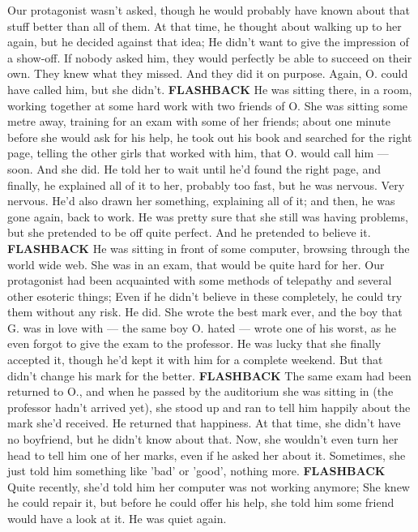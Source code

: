 Our protagonist wasn't asked, though he would probably have known about that stuff better than all of them. 
At that time, he thought about walking up to her again, but he decided against that idea; He didn't want to give the impression of a show-off. 
If nobody asked him, they would perfectly be able to succeed on their own. 
They knew what they missed. 
And they did it on purpose. 
Again, O. could have called him, but she didn't. 
\textbf{FLASHBACK}
He was sitting there, in a room, working together at some hard work with two friends of O. 
She was sitting some metre away, training for an exam with some of her friends; about one minute before she would ask for his help, he took out his book and searched for the right page, telling the other girls that worked with him, that O. would call him --- soon. 
And she did. 
He told her to wait until he'd found the right page, and finally, he explained all of it to her, probably too fast, but he was nervous. 
Very nervous. 
He'd also drawn her something, explaining all of it; and then, he was gone again, back to work. 
He was pretty sure that she still was having problems, but she pretended to be off quite perfect. 
And he pretended to believe it. 
\textbf{FLASHBACK}
He was sitting in front of some computer, browsing through the world wide web. 
She was in an exam, that would be quite hard for her. 
Our protagonist had been acquainted with some methods of telepathy and several other esoteric things; Even if he didn't believe in these completely, he could try them without any risk. 
He did. 
She wrote the best mark ever, and the boy that G. was in love with --- the same boy O. hated --- wrote one of his worst, as he even forgot to give the exam to the professor. 
He was lucky that she finally accepted it, though he'd kept it with him for a complete weekend. 
But that didn't change his mark for the better. 
\textbf{FLASHBACK}
The same exam had been returned to O., and when he passed by the auditorium she was sitting in (the professor hadn't arrived yet), she stood up and ran to tell him happily about the mark she'd received. 
He returned that happiness. 
At that time, she didn't have no boyfriend, but he didn't know about that. 
Now, she wouldn't even turn her head to tell him one of her marks, even if he asked her about it. 
Sometimes, she just told him something like 'bad' or 'good', nothing more. 
\textbf{FLASHBACK}
Quite recently, she'd told him her computer was not working anymore; She knew he could repair it, but before he could offer his help, she told him some friend would have a look at it. 
He was quiet again. 
